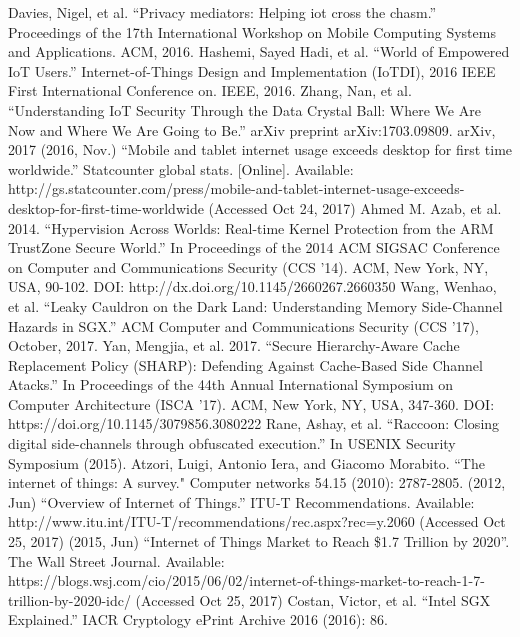  Davies, Nigel, et al. ``Privacy mediators: Helping iot cross the chasm.'' Proceedings of the 17th International Workshop on Mobile Computing Systems and Applications. ACM, 2016.
 Hashemi, Sayed Hadi, et al. ``World of Empowered IoT Users.'' Internet-of-Things Design and Implementation (IoTDI), 2016 IEEE First International Conference on. IEEE, 2016.
 Zhang, Nan, et al. ``Understanding IoT Security Through the Data Crystal Ball: Where We Are Now and Where We Are Going to Be.'' arXiv preprint arXiv:1703.09809. arXiv, 2017
 (2016, Nov.) ``Mobile and tablet internet usage exceeds desktop for first time worldwide.'' Statcounter global stats. [Online]. Available: http://gs.statcounter.com/press/mobile-and-tablet-internet-usage-exceeds-desktop-for-first-time-worldwide (Accessed Oct 24, 2017)
 Ahmed M. Azab, et al. 2014. ``Hypervision Across Worlds: Real-time Kernel Protection from the ARM TrustZone Secure World.'' In Proceedings of the 2014 ACM SIGSAC Conference on Computer and Communications Security (CCS '14). ACM, New York, NY, USA, 90-102. DOI: http://dx.doi.org/10.1145/2660267.2660350
 Wang, Wenhao, et al. ``Leaky Cauldron on the Dark Land: Understanding Memory Side-Channel Hazards in SGX.'' ACM Computer and Communications Security (CCS ’17), October, 2017.
 Yan, Mengjia, et al. 2017. ``Secure Hierarchy-Aware Cache Replacement Policy (SHARP): Defending Against Cache-Based Side Channel Atacks.'' In Proceedings of the 44th Annual International Symposium on Computer Architecture (ISCA '17). ACM, New York, NY, USA, 347-360. DOI: https://doi.org/10.1145/3079856.3080222
 Rane, Ashay, et al. ``Raccoon: Closing digital side-channels through obfuscated execution.'' In USENIX Security Symposium (2015).
 Atzori, Luigi, Antonio Iera, and Giacomo Morabito. ``The internet of things: A survey." Computer networks 54.15 (2010): 2787-2805.
 (2012, Jun) ``Overview of Internet of Things.'' ITU-T Recommendations. Available: http://www.itu.int/ITU-T/recommendations/rec.aspx?rec=y.2060 (Accessed Oct 25, 2017)
 (2015, Jun) ``Internet of Things Market to Reach \$1.7 Trillion by 2020''. The Wall Street Journal. Available: https://blogs.wsj.com/cio/2015/06/02/internet-of-things-market-to-reach-1-7-trillion-by-2020-idc/ (Accessed Oct 25, 2017)
 Costan, Victor, et al. ``Intel SGX Explained.'' IACR Cryptology ePrint Archive 2016 (2016): 86.

